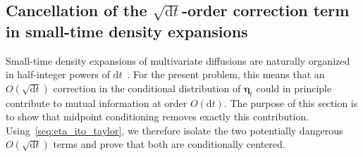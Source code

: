 

\subsection{Cancellation of the $\sqrt{\mathrm{d}t}$-order correction term in small-time density expansions}
\vspace*{-0.6\baselineskip}
Small-time density expansions of multivariate diffusions are naturally organized in half-integer powers of $\mathrm dt$~\cite{watanabe1987analysis,yoshida1992asymptotic,li2013maximum,yang2019anew}. For the present problem, this means that an $O(\sqrt{\mathrm dt})$ correction in the conditional distribution of $\bm\eta_t$ could in principle contribute to mutual information at order $O(\mathrm dt)$. The purpose of this section is to show that midpoint conditioning removes exactly this contribution. Using~\eqref{seq:eta_ito_taylor}, we therefore isolate the two potentially dangerous $O(\sqrt{\mathrm dt})$ terms and prove that both are conditionally centered.

